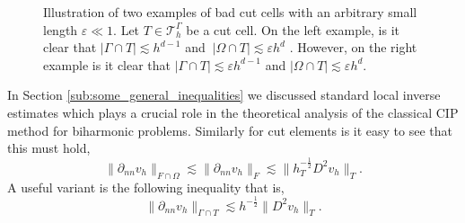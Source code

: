 \documentclass[11pt]{article}
\theoremstyle{remark}
\newcommand{\abs}[1]{\left\lvert #1 \right\rvert}
\numberwithin{equation}{section}
\begin{document}
\begin{figure}[b]
\begin{minipage}{0.4\textwidth}
    \end{minipage}
        \caption{Illustration of two examples of bad cut cells with an arbitrary small length $\varepsilon \ll 1 $. Let $T \in  \mathcal{T}^{\Gamma }_h $ be a cut cell.  On the left example, is it clear that $\abs{ \Gamma \cap T }
            \lesssim  h^{d-1}$ and $  \ \abs{ \Omega  \cap T } \lesssim  \varepsilon  h^{d}$  . However, on the right example is it clear that  $\abs{ \Gamma \cap T }
            \lesssim  \varepsilon h^{d-1}$ and $\abs{ \Omega  \cap T } \lesssim  \varepsilon  h^{d}$.}
        \label{fig:intersection-example}
\end{figure}


In Section \ref{sub:some_general_inequalities} we discussed standard local inverse estimates which plays a crucial role in the theoretical analysis of the classical CIP method for biharmonic problems.
Similarly for cut elements is it easy to see that this must hold,
\begin{equation}
    \label{eq:inv_full1}
     \| \partial _{nn}  v_{h} \|_{F \cap \Omega    }^{  }  \lesssim\| \partial _{nn}  v_{h} \|_{F }^{  }  \lesssim   \| h_{T}^{-\frac{1}{2}} D ^2 v_{h} \|_{ T }^{  }.
\end{equation}
A useful variant is the following inequality that is,
\begin{equation}
    \label{eq:inv_full}
\| \partial _{nn} v_{h} \|_{ \Gamma \cap T  }^{  } \lesssim h^{-\frac{1}{2}} \| D^2 v_{h} \|_{ T }^{  }.
\end{equation}
\end{document}
